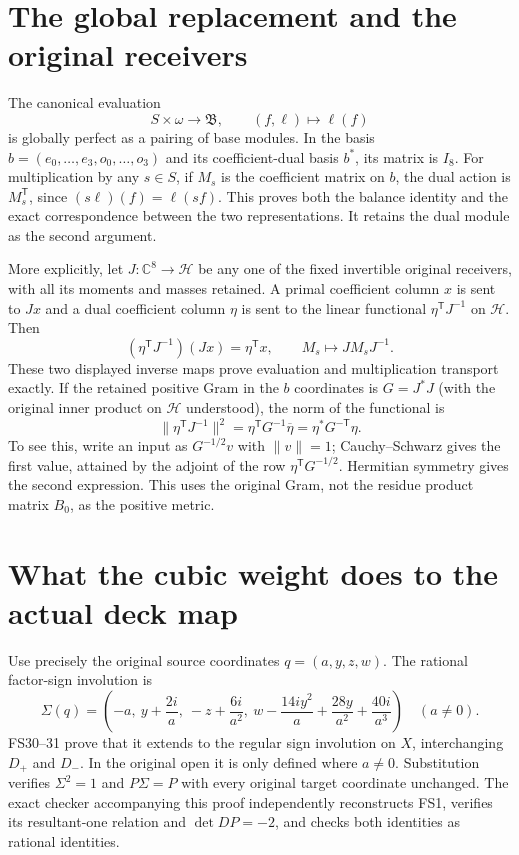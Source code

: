 \documentclass[10pt]{article}
\newcommand{\C}{\mathbb C}
\begin{document}
\section{The global replacement and the original receivers}
The canonical evaluation
\begin{equation}
 S\times\omega\longrightarrow\mathfrak B,
 \qquad (f,\ell)\longmapsto\ell(f)
 \tag{GDR15}
\end{equation}
is globally perfect as a pairing of base modules. In the basis
$b=(e_0,\ldots,e_3,o_0,\ldots,o_3)$ and its coefficient-dual
basis $b^*$, its matrix is $I_8$. For multiplication by any
$s\in S$, if $M_s$ is the coefficient matrix on $b$, the
dual action is $M_s^{\mathsf T}$, since
$(s\ell)(f)=\ell(sf)$. This proves both the balance identity
and the exact correspondence between the two representations.
It retains the dual module as the second argument.

More explicitly, let $J:\C^8\to\mathcal H$ be any one of
the fixed invertible original receivers, with all its moments
and masses retained. A primal coefficient column $x$ is sent
to $Jx$ and a dual coefficient column $\eta$ is sent to the
linear functional $\eta^{\mathsf T}J^{-1}$ on $\mathcal H$.
Then
\begin{equation}
 (\eta^{\mathsf T}J^{-1})(Jx)=\eta^{\mathsf T}x,
 \qquad M_s\longmapsto JM_sJ^{-1}.
 \tag{GDR16}
\end{equation}
These two displayed inverse maps prove evaluation and
multiplication transport exactly. If the retained positive
Gram in the $b$ coordinates is $G=J^*J$ (with the original
inner product on $\mathcal H$ understood), the norm of the
functional is
\begin{equation}
 \|\eta^{\mathsf T}J^{-1}\|^2
   =\eta^{\mathsf T}G^{-1}\overline\eta
   =\eta^*G^{-\mathsf T}\eta.
 \tag{GDR17}
\end{equation}
To see this, write an input as $G^{-1/2}v$ with $\|v\|=1$;
Cauchy--Schwarz gives the first value, attained by the
adjoint of the row $\eta^{\mathsf T}G^{-1/2}$. Hermitian
symmetry gives the second expression. This uses the original
Gram, not the residue product matrix $B_0$, as the positive
metric.

\section{What the cubic weight does to the actual deck map}
Use precisely the original source coordinates $q=(a,y,z,w)$.
The rational factor-sign involution is
\begin{equation}
 \Sigma(q)=\left(-a,\ y+\frac{2i}{a},\ -z+\frac{6i}{a^2},\
 w-\frac{14iy^2}{a}+\frac{28y}{a^2}+\frac{40i}{a^3}\right)
 \quad(a\ne0).
 \tag{GDR18}
\end{equation}
FS30--31 prove that it extends to the regular sign involution
on $X$, interchanging $D_+$ and $D_-$. In the original open
it is only defined where $a\ne0$. Substitution verifies
$\Sigma^2=1$ and $P\Sigma=P$ with every original target
coordinate unchanged. The exact checker accompanying this
proof independently reconstructs FS1, verifies its
resultant-one relation and $\det DP=-2$, and checks both
identities as rational identities.
\end{document}
